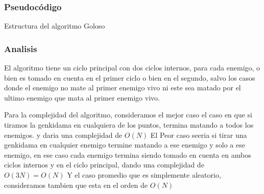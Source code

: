 \subsubsection{Pseudocódigo}
\begin{algorithm}[h!]
\caption{Estructura del algoritmo Goloso}
\begin{algorithmic}[1]
	  \EndWhile

        \EndWhile
	\EndWhile
	\EndFunction
\end{algorithmic}
\end{algorithm}



\subsubsection{Analisis}
El algoritmo tiene un ciclo principal con dos ciclos internos,  para cada enemigo, o bien es tomado en cuenta en el primer ciclo o bien en el segundo, salvo los casos donde el enemigo no mate al primer enemigo vivo ni este sea matado por el ultimo enemigo que mata al primer enemigo vivo.

Para la complejidad del algoritmo, consideramos el mejor caso el caso en que si tiramos la genkidama en cualquiera de los puntos, termina matando a todos los enemigos. y daria una complejidad de $O(N)$
El Peor caso seeria si tirar una genkidama en cualquier enemigo termine matando a ese enemigo y solo a ese enemigo, en ese caso cada enemigo termina siendo tomado en cuenta en ambos ciclos internos y en el ciclo principal, dando una complejidad de $O(3N) = O(N)$
Y el caso promedio que es simplemente aleatorio, consideramos tambien que esta en el orden de $O(N)$